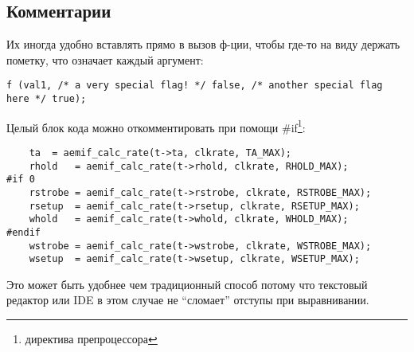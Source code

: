 ﻿\subsection{Комментарии}

Их иногда удобно вставлять прямо в вызов ф-ции, чтобы где-то на виду держать пометку,
что означает каждый аргумент:

\begin{lstlisting}
f (val1, /* a very special flag! */ false, /* another special flag here */ true);
\end{lstlisting}

Целый блок кода можно откомментировать при помощи \#if\footnote{директива препроцессора}:

\begin{lstlisting}
	ta	= aemif_calc_rate(t->ta, clkrate, TA_MAX);
	rhold	= aemif_calc_rate(t->rhold, clkrate, RHOLD_MAX);
#if 0	
	rstrobe	= aemif_calc_rate(t->rstrobe, clkrate, RSTROBE_MAX);
	rsetup	= aemif_calc_rate(t->rsetup, clkrate, RSETUP_MAX);
	whold	= aemif_calc_rate(t->whold, clkrate, WHOLD_MAX);
#endif	
	wstrobe	= aemif_calc_rate(t->wstrobe, clkrate, WSTROBE_MAX);
	wsetup	= aemif_calc_rate(t->wsetup, clkrate, WSETUP_MAX);
\end{lstlisting}

Это может быть удобнее чем традиционный способ потому что текстовый редактор или IDE в этом случае
не ``сломает'' отступы при выравнивании.

